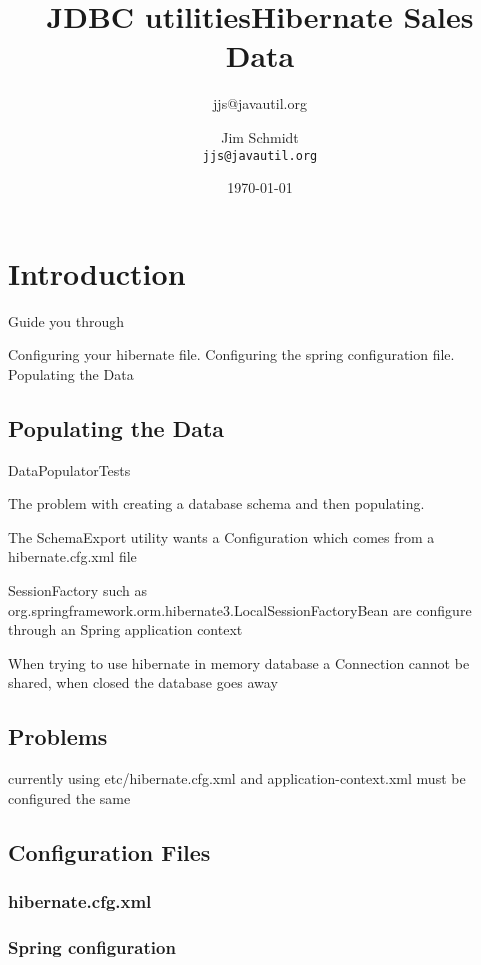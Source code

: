 \documentclass[a4paper,10pt]{book}
\title{JDBC utilities}
\author{jjs@javautil.org}
\begin{document}
\title{Hibernate Sales Data}
\author{Jim Schmidt\\
  \texttt{jjs@javautil.org}}
\date{\today}
\maketitle
\tableofcontents
\chapter{Introduction}
Guide you through

Configuring your hibernate file.
Configuring the spring configuration file.
Populating the Data

\section{Populating the Data}
DataPopulatorTests

The problem with creating a database schema and then populating.

The SchemaExport utility wants a Configuration which comes from a hibernate.cfg.xml file

SessionFactory such as org.springframework.orm.hibernate3.LocalSessionFactoryBean are configure through
an Spring application context

When trying to use hibernate in memory database a Connection cannot be shared, when closed the database goes away

\section{Problems}
currently using etc/hibernate.cfg.xml and application-context.xml must be configured the same

\section{Configuration Files}
\subsection {hibernate.cfg.xml}

\subsection{Spring configuration}

\end{document}
